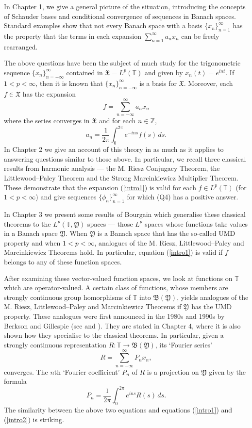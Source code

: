 \documentclass[mstat,12pt]{unswthesis}  %
\newcommand{\T}{\mathbb{T}}
\newcommand{\Z}{\mathbb{Z}}
\newcommand{\B}{\mathfrak{B}}
\newcommand{\X}{\mathfrak{X}}
\newcommand{\Y}{\mathfrak{Y}}
\numberwithin{equation}{section}
\begin{document}
In Chapter 1, we give a general picture of the situation, introducing the
concepts of Schauder bases and conditional convergence of sequences in Banach
spaces. Standard examples show that not every Banach space with a basis
$\{x_n\}_{n=1}^{\infty}$ has the property that the terms in each expansion 
$\sum_{n=1}^{\infty}a_nx_n$ can be freely rearranged.


The above questions have been the subject of much study for the trigonometric
sequence $\{x_n\}_{n=-\infty}^{\infty}$ contained in $\X=L^p(\T)$ and given by
$x_n(t)=e^{int}$. If $1<p<\infty$, then it is known that
$\{x_n\}_{n=-\infty}^{\infty}$ is a basis for $\X$. Moreover, each $f\in\X$ has
the expansion
\begin{equation}\label{intro1}
f=\sum_{n=-\infty}^{\infty}a_nx_n
\end{equation}
where the series converges in $\X$ and for each $n\in\Z$,
\begin{equation}\label{intro2}
a_n=\frac{1}{2\pi}\int_0^{2\pi}e^{-ins}f(s)\,ds.
\end{equation}
In Chapter 2 we give an account of this theory in as much as it applies to
answering questions similar to those above. In particular, we recall three
classical results from harmonic analysis --- the M. Riesz Conjugacy Theorem,
the Littlewood--Paley Theorem and the Strong Marcinkiewicz Multiplier Theorem.
These demonstrate that the expansion (\ref{intro1}) is valid for each 
$f\in L^p(\T)$ (for $1<p<\infty$) and give sequences
$\{\phi_n\}_{n=1}^{\infty}$ for which (Q4) has a positive answer.

In Chapter 3 we present some results of Bourgain
which generalise these classical theorems to the $L^p(\T,\Y)$ spaces
--- those $L^p$ spaces whose functions take values in a Banach space $\Y$. 
When
$\Y$ is a Banach space that has the so-called UMD property and when 
$1<p<\infty$,
analogues of the M. Riesz, Littlewood--Paley and Marcinkiewicz Theorems hold. In
particular, equation (\ref{intro1}) is valid if $f$ belongs to any of these
function spaces.

After examining these vector-valued function spaces, we look at functions on
$\T$ which are operator-valued. A certain class of functions, whose members are
strongly continuous group homorphisms of $\T$ into $\B(\Y)$, yields analogues of
the M. Riesz, Littlewood--Paley and Marcinkiewicz Theorems if
$\Y$ has the UMD property.
These analogues were first announced in the 1980s and 1990s by Berkson
and Gillespie (see \cite{BG Fourier} and \cite{BG Spectral}). They are stated
in Chapter 4, where it is also shown how they
specialise to the classical theorems. In particular, given a strongly continuous
representation $R:\T\rightarrow\B(\Y)$, its `Fourier series'
\[R=\sum_{n=-\infty}^{\infty}P_nx_n,\]
converges. The $n$th `Fourier coefficient' $P_n$ of $R$ is a projection
on $\Y$ given by the formula
\[P_n=\frac{1}{2\pi}\int_0^{2\pi}e^{ins}R(s)\,ds.\]
The similarity between the above two equations and equations (\ref{intro1}) and
(\ref{intro2}) is striking.
\end{document}
